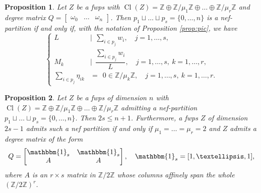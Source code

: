 \documentclass[10pt,a4paper]{amsart}
\newtheorem{proposition}{Proposition}
\DeclareMathOperator{\Cl}{Cl}
\newcommand{\Z}{\mathbb{Z}}
\begin{document}
\begin{proposition}\label{prop:nef-part}
    Let $Z$ be a fwps with $\Cl(Z)=\Z\oplus \Z/\mu_1\Z\oplus\dots\oplus\Z/\mu_r\Z$ and degree matrix $Q=\begin{bmatrix}
        \omega_0 & \dots & \omega_n
    \end{bmatrix}$. Then $p_1\sqcup\dots\sqcup p_s=\{0,\dots,n\}$ is a nef-partition if and only if, with the notation of Proposition \ref{prop:pic}, we have
    $$
    \begin{cases}
        L & | \ \ \sum_{i\in p_j} w_i,\quad j=1,\dots,s,\\[3pt]
        M_k & | \ \ \dfrac{\sum_{i\in p_j}w_i}{L},\quad j=1,\dots,s,\ k=1,\dots,r,\\[5pt]
        \sum_{i\in p_j}\eta_{ik} & =\ \ 0\in\Z/\mu_k\Z,\quad j=1,\dots,s,\ k=1,\dots,r.
    \end{cases}
    $$
\end{proposition}

\begin{proposition}\label{prop:maximal codimension}
    Let $Z$ be a fwps of dimension $n$ with $\Cl(Z)=\Z\oplus \Z/\mu_1\Z\oplus\dots\oplus\Z/\mu_r\Z$ admitting a nef-partition $p_1\sqcup\dots\sqcup p_s=\{0,\dots,n\}$. Then $2s\leq n+1$. Furthermore, a fwps $Z$ of dimension $2s-1$ admits such a nef partition if and only if $\mu_1=\dots=\mu_r=2$ and $Z$ admits a degree matrix of the form
    $$
    Q = \begin{bmatrix}
    \mathbbm{1}_{s} & \mathbbm{1}_s \\
    A & A
    \end{bmatrix},\quad \mathbbm{1}_s=[1,\dots,1],
    $$
    where $A$ is an $r\times s$ matrix in $\Z/2\Z$ whose columns affinely span the whole $(\Z/2\Z)^r$.
\end{proposition}
\end{document}
